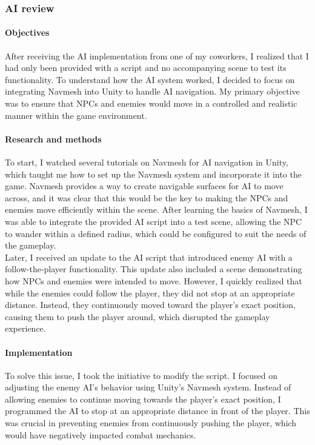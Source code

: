 \documentclass{article}
\begin{document}
\subsubsection{AI review}
\paragraph{Objectives}\hfill

After receiving the AI implementation from one of my coworkers, I realized that I had only been provided with a script and no accompanying scene to test its functionality. To understand how the AI system worked, I decided to focus on integrating Navmesh into Unity to handle AI navigation. My primary objective was to ensure that NPCs and enemies would move in a controlled and realistic manner within the game environment.

\paragraph{Research and methods}\hfill

To start, I watched several tutorials on Navmesh for AI navigation in Unity, which taught me how to set up the Navmesh system and incorporate it into the game. Navmesh provides a way to create navigable surfaces for AI to move across, and it was clear that this would be the key to making the NPCs and enemies move efficiently within the scene. After learning the basics of Navmesh, I was able to integrate the provided AI script into a test scene, allowing the NPC to wander within a defined radius, which could be configured to suit the needs of the gameplay.\\

Later, I received an update to the AI script that introduced enemy AI with a follow-the-player functionality. This update also included a scene demonstrating how NPCs and enemies were intended to move. However, I quickly realized that while the enemies could follow the player, they did not stop at an appropriate distance. Instead, they continuously moved toward the player's exact position, causing them to push the player around, which disrupted the gameplay experience.

\paragraph{Implementation}\hfill

To solve this issue, I took the initiative to modify the script. I focused on adjusting the enemy AI's behavior using Unity's Navmesh system. Instead of allowing enemies to continue moving towards the player's exact position, I programmed the AI to stop at an appropriate distance in front of the player. This was crucial in preventing enemies from continuously pushing the player, which would have negatively impacted combat mechanics.\\
\end{document}
